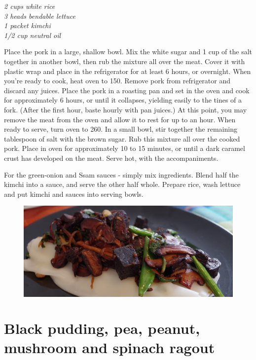 \documentclass{tufte-book}
\begin{document}

\emph{2 cups white rice
\\3 heads bendable lettuce
\\1 packet kimchi
\\1/2 cup neutral oil
}

Place the pork in a large, shallow bowl. Mix the white sugar and 1 cup of the salt together in another bowl, then rub the mixture all over the meat. Cover it with plastic wrap and place in the refrigerator for at least 6 hours, or overnight.
When you're ready to cook, heat oven to 150\celsius. Remove pork from refrigerator and discard any juices. Place the pork in a roasting pan and set in the oven and cook for approximately 6 hours, or until it collapses, yielding easily to the tines of a fork. (After the first hour, baste hourly with pan juices.) At this point, you may remove the meat from the oven and allow it to rest for up to an hour.
When ready to serve, turn oven to 260\celsius. In a small bowl, stir together the remaining tablespoon of salt with the brown sugar. Rub this mixture all over the cooked pork. Place in oven for approximately 10 to 15 minutes, or until a dark caramel crust has developed on the meat. Serve hot, with the accompaniments.

For the green-onion and Ssam sauces - simply mix ingredients. 
Blend half the kimchi into a sauce, and serve the other half whole.
Prepare rice, wash lettuce and put kimchi and sauces into serving bowls.

\newpage

\begin{figure}[h]
  \includegraphics[width=\linewidth]{blackpuddingragout.JPG}
\end{figure}

\section{Black pudding, pea, peanut, mushroom and spinach ragout}
\end{document}
